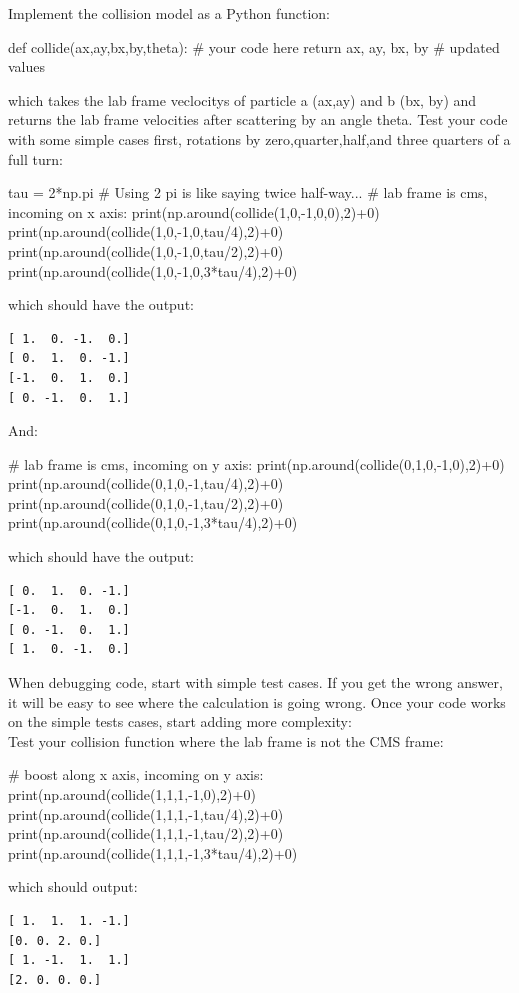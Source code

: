 {\plot Implement the collision model as a Python function:
\begin{python}
def collide(ax,ay,bx,by,theta):
    # your code here
    return ax, ay, bx, by # updated values
\end{python}
which takes the lab frame veclocitys of particle a (ax,ay) and b (bx, by) and returns the lab frame velocities after scattering by an angle theta.  Test your code with some simple cases first, rotations by zero,quarter,half,and three quarters of a full turn:
\begin{python}
tau = 2*np.pi # Using 2 pi is like saying twice half-way...
# lab frame is cms, incoming on x axis:
print(np.around(collide(1,0,-1,0,0),2)+0)
print(np.around(collide(1,0,-1,0,tau/4),2)+0)
print(np.around(collide(1,0,-1,0,tau/2),2)+0)
print(np.around(collide(1,0,-1,0,3*tau/4),2)+0)
\end{python}
which should have the output:
\begin{verbatim}
[ 1.  0. -1.  0.]
[ 0.  1.  0. -1.]
[-1.  0.  1.  0.]
[ 0. -1.  0.  1.]
\end{verbatim}
And:
\begin{python}
# lab frame is cms, incoming on	y axis:
print(np.around(collide(0,1,0,-1,0),2)+0)
print(np.around(collide(0,1,0,-1,tau/4),2)+0)
print(np.around(collide(0,1,0,-1,tau/2),2)+0)
print(np.around(collide(0,1,0,-1,3*tau/4),2)+0)
\end{python}
which should have the output:
\begin{verbatim}
[ 0.  1.  0. -1.]
[-1.  0.  1.  0.]
[ 0. -1.  0.  1.]
[ 1.  0. -1.  0.]
\end{verbatim}

\newpage

When debugging code, start with simple test cases.  If you get the
wrong answer, it will be easy to see where the calculation is going
wrong.  Once your code works on the simple tests cases, start adding
more complexity:\\

\plot Test your collision function where the lab frame is not the CMS frame:
\begin{python}
# boost along x axis, incoming on y axis:
print(np.around(collide(1,1,1,-1,0),2)+0)
print(np.around(collide(1,1,1,-1,tau/4),2)+0)
print(np.around(collide(1,1,1,-1,tau/2),2)+0)
print(np.around(collide(1,1,1,-1,3*tau/4),2)+0)
\end{python}
which should output:
\begin{verbatim}
[ 1.  1.  1. -1.]
[0. 0. 2. 0.]
[ 1. -1.  1.  1.]
[2. 0. 0. 0.]
\end{verbatim} \vskip 0.25cm

}
